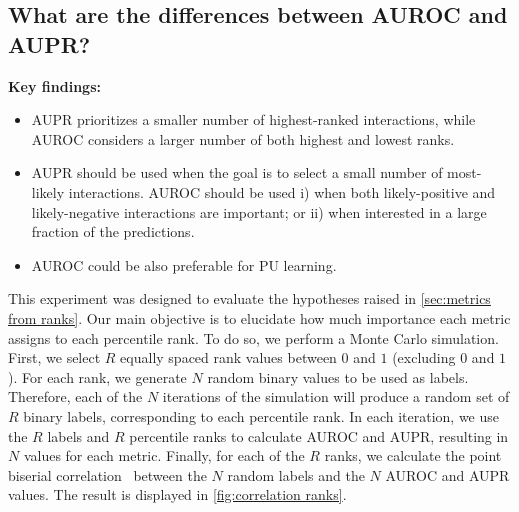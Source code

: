 \subsection{What are the differences between AUROC and AUPR?}
\label{sec:comparing auroc aupr}

\begin{mdframed}
    \textbf{Key findings:}
    \begin{itemize}
        \item AUPR prioritizes a smaller number of highest-ranked interactions, while AUROC considers a larger number of both highest and lowest ranks.
        \item AUPR should be used when the goal is to select a small number of most-likely interactions. AUROC should be used i) when both likely-positive and likely-negative interactions are important; or ii) when interested in a large fraction of the predictions.
        \item AUROC could be also preferable for PU learning.
    \end{itemize}
\end{mdframed}

This experiment was designed to evaluate the hypotheses raised in \autoref{sec:metrics from ranks}. Our main objective is to elucidate how much importance each metric assigns to each percentile rank. To do so, we perform a Monte Carlo simulation. First, we select $R$ equally spaced rank values between $0$ and $1$ (excluding $0$ and $1$). For each rank, we generate $N$ random binary values to be used as labels. Therefore, each of the $N$ iterations of the simulation will produce a random set of $R$ binary labels, corresponding to each percentile rank. In each iteration, we use the $R$ labels and $R$ percentile ranks to calculate AUROC and AUPR, resulting in $N$ values for each metric. Finally, for each of the $R$ ranks, we calculate the point biserial correlation~\cite{kornbrot2014point} between the $N$ random labels and the $N$ AUROC and AUPR values. The result is displayed in \autoref{fig:correlation ranks}.


